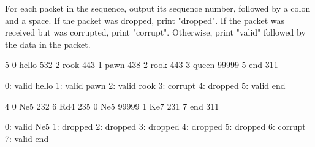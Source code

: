 \begin{formalout}
For each packet in the sequence, output its sequence number, followed by a colon and a space. If the packet was dropped, print "dropped". If the packet was received but was corrupted, print "corrupt". Otherwise, print "valid" followed by the data in the packet. 
\end{formalout}


\begin{datain}
5
0 hello 532
2 rook 443
1 pawn 438
2 rook 443
3 queen 99999
5 end 311
\end{datain}
\begin{dataout}
0: valid hello
1: valid pawn
2: valid rook
3: corrupt
4: dropped
5: valid end
\end{dataout}

\begin{datain}
4
0 Ne5 232
6 Rd4 235
0 Ne5 99999
1 Ke7 231
7 end 311
\end{datain}
\begin{dataout}
0: valid Ne5
1: dropped
2: dropped
3: dropped
4: dropped
5: dropped
6: corrupt
7: valid end
\end{dataout}

